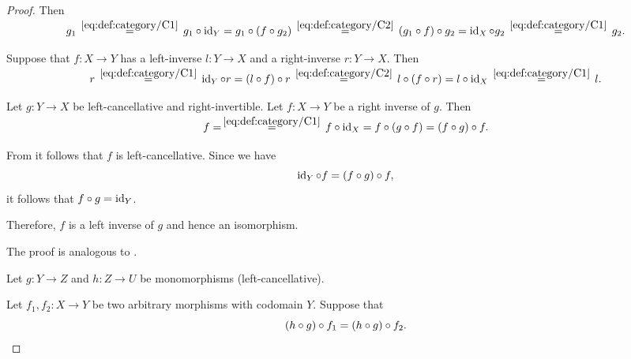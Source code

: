 \begin{proof}
  Then
  \begin{equation*}
    g_1
    \reloset {\eqref{eq:def:category/C1}} =
    g_1 \bincirc \id_Y
    =
    g_1 \bincirc (f \bincirc g_2)
    \reloset {\eqref{eq:def:category/C2}} =
    (g_1 \bincirc f) \bincirc g_2
    =
    \id_X \bincirc g_2
    \reloset {\eqref{eq:def:category/C1}} =
    g_2.
  \end{equation*}

   Suppose that \( f: X \to Y \) has a left-inverse \( l: Y \to X \) and a right-inverse \( r: Y \to X \). Then
  \begin{equation*}
    r
    \reloset {\eqref{eq:def:category/C1}} =
    \id_Y \bincirc r
    =
    (l \bincirc f) \bincirc r
    \reloset {\eqref{eq:def:category/C2}} =
    l \bincirc (f \bincirc r)
    =
    l \bincirc \id_X
    \reloset {\eqref{eq:def:category/C1}} =
    l.
  \end{equation*}

   Let \( g: Y \to X \) be left-cancellative and right-invertible. Let \( f: X \to Y \) be a right inverse of \( g \). Then
  \begin{equation*}
    f
    =
    \reloset {\eqref{eq:def:category/C1}} =
    f \bincirc \id_X
    =
    f \bincirc (g \bincirc f)
    =
    (f \bincirc g) \bincirc f.
  \end{equation*}

  From  it follows that \( f \) is left-cancellative. Since we have
  \begin{equation*}
    \id_Y \bincirc f
    =
    (f \bincirc g) \bincirc f,
  \end{equation*}
  it follows that \( f \bincirc g = \id_Y \).

  Therefore, \( f \) is a left inverse of \( g \) and hence an isomorphism.

   The proof is analogous to .

   Let \( g: Y \to Z \) and \( h: Z \to U \) be monomorphisms (left-cancellative).

  Let \( f_1, f_2: X \to Y \) be two arbitrary morphisms with codomain \( Y \). Suppose that
  \begin{equation*}
    (h \bincirc g) \bincirc f_1 = (h \bincirc g) \bincirc f_2.
  \end{equation*}


\end{proof}
